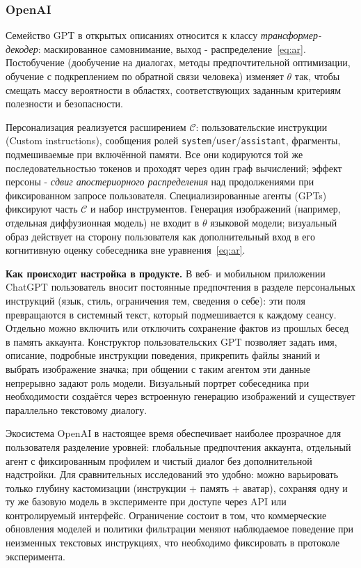 \documentclass[areasetadvanced]{scrartcl}
\begin{document}
\subsubsection{OpenAI}

Семейство GPT в открытых описаниях относится к классу \emph{трансформер-декодер}: маскированное самовнимание, выход - распределение~\eqref{eq:ar}. Постобучение (дообучение на диалогах, методы предпочтительной оптимизации, обучение с подкреплением по обратной связи человека) изменяет $\theta$ так, чтобы смещать массу вероятности в областях, соответствующих заданным критериям полезности и безопасности.

Персонализация реализуется расширением $\mathcal{C}$: пользовательские инструкции (Custom instructions), сообщения ролей \texttt{system}/\texttt{user}/\texttt{assistant}, фрагменты, подмешиваемые при включённой памяти. Все они кодируются той же последовательностью токенов и проходят через один граф вычислений; эффект персоны - \emph{сдвиг апостериорного распределения} над продолжениями при фиксированном запросе пользователя. Специализированные агенты (GPTs) фиксируют часть $\mathcal{C}$ и набор инструментов. Генерация изображений (например, отдельная диффузионная модель) не входит в $\theta$ языковой модели; визуальный образ действует на сторону пользователя как дополнительный вход в его когнитивную оценку собеседника вне уравнения~\eqref{eq:ar}.

\textbf{Как происходит настройка в продукте.} В веб- и мобильном приложении ChatGPT пользователь вносит постоянные предпочтения в разделе персональных инструкций (язык, стиль, ограничения тем, сведения о себе): эти поля превращаются в системный текст, который подмешивается к каждому сеансу. Отдельно можно включить или отключить сохранение фактов из прошлых бесед в память аккаунта. Конструктор пользовательских GPT позволяет задать имя, описание, подробные инструкции поведения, прикрепить файлы знаний и выбрать изображение значка; при общении с таким агентом эти данные непрерывно задают роль модели. Визуальный портрет собеседника при необходимости создаётся через встроенную генерацию изображений и существует параллельно текстовому диалогу.

Экосистема OpenAI в настоящее время обеспечивает наиболее прозрачное для пользователя разделение уровней: глобальные предпочтения аккаунта, отдельный агент с фиксированным профилем и чистый диалог без дополнительной надстройки. Для сравнительных исследований это удобно: можно варьировать только глубину кастомизации (инструкции + память + аватар), сохраняя одну и ту же базовую модель в эксперименте при доступе через API или контролируемый интерфейс. Ограничение состоит в том, что коммерческие обновления моделей и политики фильтрации меняют наблюдаемое поведение при неизменных текстовых инструкциях, что необходимо фиксировать в протоколе эксперимента.
\end{document}
